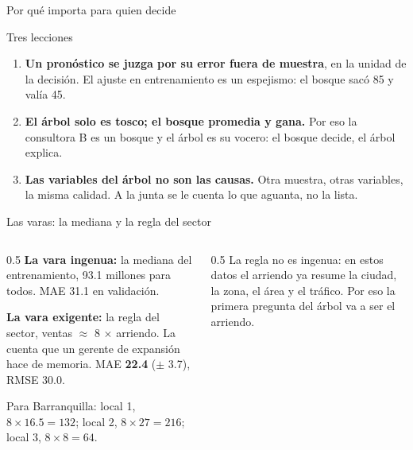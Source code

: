 \documentclass{beamer}
\begin{document}
\begin{frame}{Por qué importa para quien decide}
\small
\begin{block}{Tres lecciones}
\begin{enumerate}\itemsep3pt
  \item \textbf{Un pronóstico se juzga por su error fuera de muestra}, en la unidad de la decisión. El ajuste en entrenamiento es un espejismo: el bosque sacó 85 y valía 45.
  \item \textbf{El árbol solo es tosco; el bosque promedia y gana.} Por eso la consultora B es un bosque y el árbol es su vocero: el bosque decide, el árbol explica.
  \item \textbf{Las variables del árbol no son las causas.} Otra muestra, otras variables, la misma calidad. A la junta se le cuenta lo que aguanta, no la lista.
\end{enumerate}
\end{block}
\end{frame}

\begin{frame}{Las varas: la mediana y la regla del sector}
\begin{columns}[T]
\begin{column}{0.5\textwidth}
\small
\textbf{La vara ingenua:} la mediana del entrenamiento, 93.1 millones para todos. MAE 31.1 en validación.
\medskip

\textbf{La vara exigente:} la regla del sector, ventas $\approx$ 8 $\times$ arriendo. La cuenta que un gerente de expansión hace de memoria. MAE \textbf{22.4} ($\pm$ 3.7), RMSE 30.0.
\medskip

Para Barranquilla: local 1, $8 \times 16.5 = 132$; local 2, $8 \times 27 = 216$; local 3, $8 \times 8 = 64$.
\end{column}
\begin{column}{0.5\textwidth}
\medskip
\footnotesize La regla no es ingenua: en estos datos el arriendo ya resume la ciudad, la zona, el área y el tráfico. Por eso la primera pregunta del árbol va a ser el arriendo.
\end{column}
\end{columns}
\end{frame}
\end{document}
